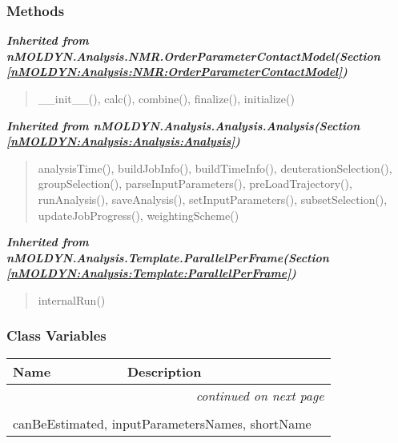 
  \subsubsection{Methods}


\large{\textbf{\textit{Inherited from nMOLDYN.Analysis.NMR.OrderParameterContactModel\textit{(Section \ref{nMOLDYN:Analysis:NMR:OrderParameterContactModel})}}}}

\begin{quote}
\_\_init\_\_(), calc(), combine(), finalize(), initialize()
\end{quote}

\large{\textbf{\textit{Inherited from nMOLDYN.Analysis.Analysis.Analysis\textit{(Section \ref{nMOLDYN:Analysis:Analysis:Analysis})}}}}

\begin{quote}
analysisTime(), buildJobInfo(), buildTimeInfo(), deuterationSelection(), groupSelection(), parseInputParameters(), preLoadTrajectory(), runAnalysis(), saveAnalysis(), setInputParameters(), subsetSelection(), updateJobProgress(), weightingScheme()
\end{quote}

\large{\textbf{\textit{Inherited from nMOLDYN.Analysis.Template.ParallelPerFrame\textit{(Section \ref{nMOLDYN:Analysis:Template:ParallelPerFrame})}}}}

\begin{quote}
internalRun()
\end{quote}


  \subsubsection{Class Variables}

    \vspace{-1cm}
\hspace{\varindent}\begin{longtable}{|p{\varnamewidth}|p{\vardescrwidth}|l}
\cline{1-2}
\cline{1-2} \centering \textbf{Name} & \centering \textbf{Description}& \\
\cline{1-2}
\endhead\cline{1-2}\multicolumn{3}{r}{\small\textit{continued on next page}}\\\endfoot\cline{1-2}
\endlastfoot\multicolumn{2}{|l|}{\textit{Inherited from nMOLDYN.Analysis.NMR.OrderParameterContactModel \textit{(Section \ref{nMOLDYN:Analysis:NMR:OrderParameterContactModel})}}}\\
\multicolumn{2}{|p{\varwidth}|}{\raggedright canBeEstimated, inputParametersNames, shortName}\\
\cline{1-2}
\end{longtable}

